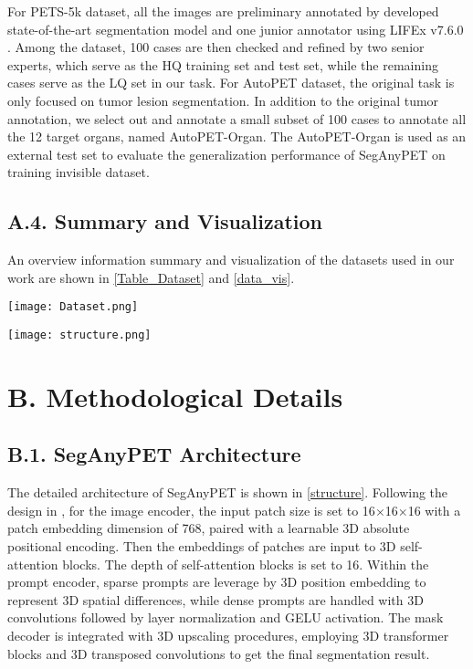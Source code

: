 For PETS-5k dataset, all the images are preliminary annotated by developed state-of-the-art segmentation model and one junior annotator using LIFEx v7.6.0 \cite{nioche2018lifex}. Among the dataset, 100 cases are then checked and refined by two senior experts, which serve as the HQ training set and test set, while the remaining cases serve as the LQ set in our task.
For AutoPET dataset, the original task is only focused on tumor lesion segmentation. In addition to the original tumor annotation, we select out and annotate a small subset of 100 cases to annotate all the 12 target organs, named AutoPET-Organ. The AutoPET-Organ is used as an external test set to evaluate the generalization performance of SegAnyPET on training invisible dataset.

\subsection*{A.4. Summary and Visualization}

An overview information summary and visualization of the datasets used in our work are shown in \cref{Table_Dataset} and \cref{data_vis}.


\begin{figure*}[t]
    \centering
	\texttt{[image: Dataset.png]}
	\caption{Visualization of PET images and corresponding organ annotations of PETS-5k dataset and AutoPET-Organ dataset.}
    \label{data_vis}
\end{figure*}





\begin{figure*}[t]
    \centering
	\texttt{[image: structure.png]}
	\caption{The detailed architecture of the network components of SegAnyPET.}
    \label{structure}
\end{figure*}




\section*{B. Methodological Details}

\subsection*{B.1. SegAnyPET Architecture}
\label{app_architecture}

The detailed architecture of SegAnyPET is shown in \cref{structure}.
Following the design in \cite{SAM-Med3D}, for the image encoder, the input patch size is set to 16$\times$16$\times$16 with a patch embedding dimension of 768, paired with a learnable 3D absolute positional encoding.
Then the embeddings of patches are input to 3D self-attention blocks. The depth of self-attention blocks is set to 16.
Within the prompt encoder, sparse prompts are leverage by 3D position embedding to represent 3D spatial differences, while dense prompts are handled with 3D convolutions followed by layer normalization and GELU activation.
The mask decoder is integrated with 3D upscaling procedures, employing 3D transformer blocks and 3D transposed convolutions to get the final segmentation result.


